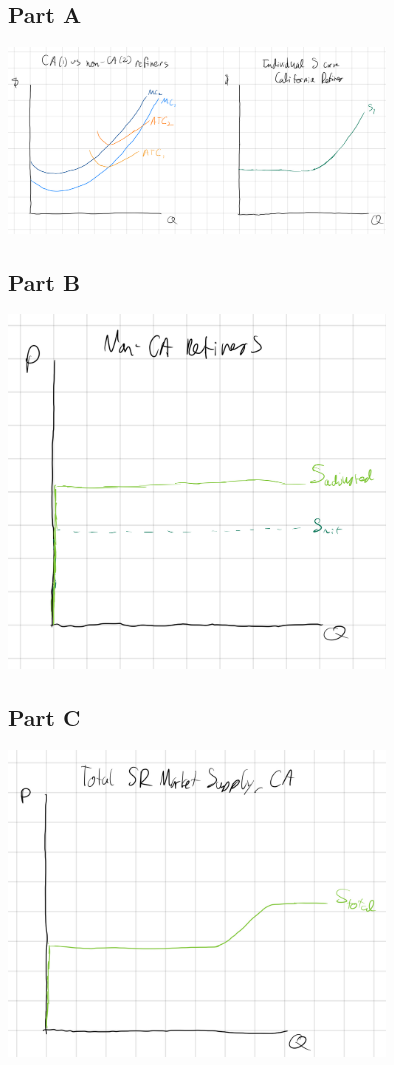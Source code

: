 \documentclass[8pt]{extarticle}
\begin{document}
{\subsection*{Part A}
\begin{center}
	\includegraphics[width=10cm]{HW8Q6A}
\end{center}
\subsection*{Part B}
\begin{center}
	\includegraphics[width=10cm]{HW8Q6B}
\end{center}
\subsection*{Part C}
\begin{center}
	\includegraphics[width=10cm]{HW8Q6C}
\end{center}
}
\end{document}
